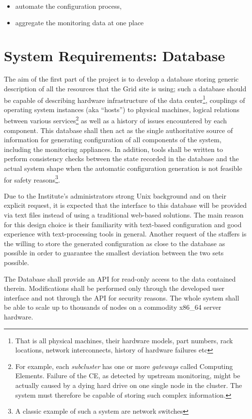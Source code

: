 \documentclass[12pt]{article}
\begin{document}
\begin{itemize}
    \item{automate the configuration process,}
    \item{aggregate the monitoring data at one place}
\end{itemize}

\section{System Requirements: Database}

The aim of the first part of the project is to develop a database storing generic description of all the resources that the Grid
site is using; such a database should be capable of describing hardware infrastructure of the data center\footnote{That is all
physical machines, their hardware models, part numbers, rack locations, network interconnects, history of hardware failures etc},
couplings of operating system instances (aka ``hosts'') to physical machines, logical relations between various
services\footnote{For example, each {\em subcluster} has one or more {\em gateways} called Computing Elements.  Failure of the CE,
as detected by upstream monitoring, might be actually caused by a dying hard drive on one single node in the cluster.  The system
must therefore be capable of storing such complex information.} as well as a history of issues encountered by each component.
This database shall then act as the single authoritative source of information for generating configuration of all components of
the system, including the monitoring appliances.  In addition, tools shall be written to perform consistency checks between the
state recorded in the database and the actual system shape when the automatic configuration generation is not feasible for safety
reasons\footnote{A classic example of such a system are network switches}.

Due to the Institute's administrators strong Unix background and on their explicit request, it is expected that the interface to
this database will be provided via text files instead of using a traditional web-based solutions.  The main reason for this design
choice is their familiarity with text-based configuration and good experience with text-processing tools in general.  Another
request of the staffers is the willing to store the generated configuration as close to the database as possible in order to
guarantee the smallest deviation between the two sets possible.

The Database shall provide an API for read-only access to the data contained therein.  Modifications shall be performed only
through the developed user interface and not through the API for security reasons.  The whole system shall be able to scale up to
thousands of nodes on a commodity x86\_64 server hardware.
\end{document}
